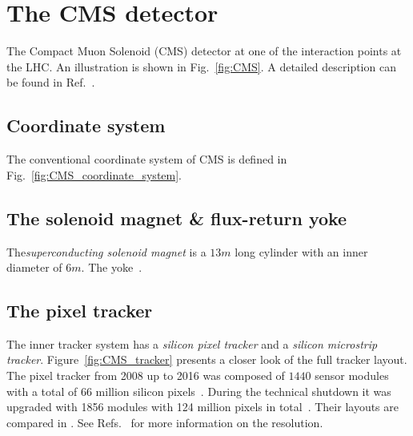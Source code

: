 \section{The CMS detector}



The Compact Muon Solenoid (CMS) detector at one of the interaction points at the LHC.
An illustration is shown in Fig.~\ref{fig:CMS}.
A detailed description can be found in Ref.~\cite{CMS}.

\subsection{Coordinate system}
The conventional coordinate system of CMS is defined in Fig.~\ref{fig:CMS_coordinate_system}.



\subsection{The solenoid magnet \& flux-return yoke}
The\emph{superconducting solenoid magnet} is a $13\unit{m}$ long cylinder with an inner diameter of $6\unit{m}$.
The yoke~\cite{CMS_yoke}.

\subsection{The pixel tracker}
The inner tracker system has a \emph{silicon pixel tracker} and a \emph{silicon microstrip tracker}. Figure~\ref{fig:CMS_tracker} presents a closer look of the full tracker layout.
The pixel tracker from 2008 up to 2016 was composed of $1440$ sensor modules with a total of $66$ million silicon pixels~\cite{CMS_vertex}.
During the technical shutdown it was upgraded with 1856 modules with 124 million pixels in total~\cite{CMS_pixel_Phase1_2017,CMS_pixel_Phase1_2021}.
Their layouts are compared in .
See Refs.~\cite{CMS_vertex,CMS_vertex_plots_2017} for more information on the resolution.

